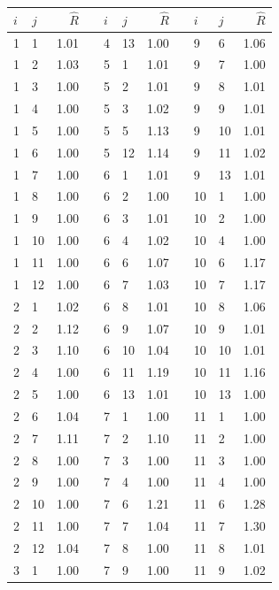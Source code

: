 \begin{table}[h!]
 \centering
 \begin{tabular}{llrp{0.2cm}llrp{0.2cm}llr}
 \hline
 $i$ & $j$ & $\hat{R}$ & &  $i$ & $j$ & $\hat{R}$ & & $i$ & $j$ & $\hat{R}$ \\
 \hline\hline
 1 & 1 & 1.01  & & 4 & 13 & 1.00 & & 9 & 6 & 1.06 \\
 1 & 2 & 1.03  & & 5 & 1 & 1.01 &  &9 & 7 & 1.00 \\
 1 & 3 & 1.00  & & 5 & 2 & 1.01 &  &9 & 8 & 1.01 \\
 1 & 4 & 1.00  & & 5 & 3 & 1.02 &  &9 & 9 & 1.01 \\
 1 & 5 & 1.00  & & 5 & 5 & 1.13 &  &9 & 10 & 1.01 \\
 1 & 6 & 1.00  & & 5 & 12 & 1.14 & & 9 & 11 & 1.02 \\
 1 & 7 & 1.00  & & 6 & 1 & 1.01 &  &9 & 13 & 1.01 \\
 1 & 8 & 1.00  & & 6 & 2 & 1.00 &  &10 & 1 & 1.00 \\
 1 & 9 & 1.00  & & 6 & 3 & 1.01 &  &10 & 2 & 1.00 \\
 1 & 10 & 1.00 &  & 6 & 4 & 1.02 & & 10 & 4 & 1.00 \\
 1 & 11 & 1.00 &  & 6 & 6 & 1.07 & & 10 & 6 & 1.17 \\
 1 & 12 & 1.00 &  & 6 & 7 & 1.03 & & 10 & 7 & 1.17 \\
 2 & 1 & 1.02  & & 6 & 8 & 1.01 &  &10 & 8 & 1.06 \\
 2 & 2 & 1.12  & & 6 & 9 & 1.07 &  &10 & 9 & 1.01 \\
 2 & 3 & 1.10  & & 6 & 10 & 1.04 & & 10 & 10 & 1.01 \\
 2 & 4 & 1.00  & & 6 & 11 & 1.19 & & 10 & 11 & 1.16 \\
 2 & 5 & 1.00  & & 6 & 13 & 1.01 & & 10 & 13 & 1.00 \\
 2 & 6 & 1.04  & & 7 & 1 & 1.00 &  &11 & 1 & 1.00 \\
 2 & 7 & 1.11  & & 7 & 2 & 1.10 &  &11 & 2 & 1.00 \\
 2 & 8 & 1.00  & & 7 & 3 & 1.00 &  &11 & 3 & 1.00 \\
 2 & 9 & 1.00  & & 7 & 4 & 1.00 &  &11 & 4 & 1.00 \\
 2 & 10 & 1.00 &  & 7 & 6 & 1.21 & & 11 & 6 & 1.28 \\
 2 & 11 & 1.00 &  & 7 & 7 & 1.04 & & 11 & 7 & 1.30 \\
 2 & 12 & 1.04 &  & 7 & 8 & 1.00 & & 11 & 8 & 1.01 \\
 3 & 1 & 1.00  & & 7 & 9 & 1.00 &  &11 & 9 & 1.02 \\

\end{tabular}
\end{table}
